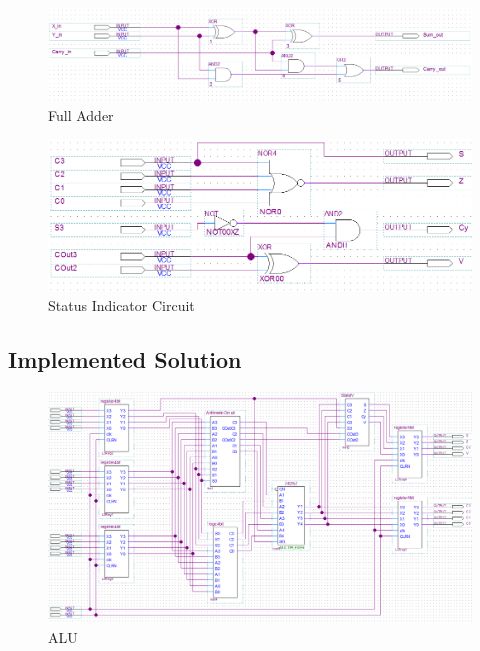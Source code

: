 \documentclass[a4paper,12pt]{article}
\begin{document}
\begin{figure}[H]
\includegraphics[width=\textwidth]{Diagrams/BlockDiagram_FullAdder.PNG} 
\caption{Full Adder}
\label{fig:FullAdder}
\end{figure}

\begin{figure}[H]
\includegraphics[width=\textwidth]{Diagrams/BlockDiagram_StateIV.PNG} 
\caption{Status Indicator Circuit}
\label{fig:StateIndicators}
\end{figure}

\subsection{Implemented Solution}

\begin{figure}[H]
\includegraphics[width=\textwidth]{Diagrams/BlockDiagram_FULL_ALU.PNG} 
\caption{ALU}
\label{fig:ALU}
\end{figure}
\end{document}
